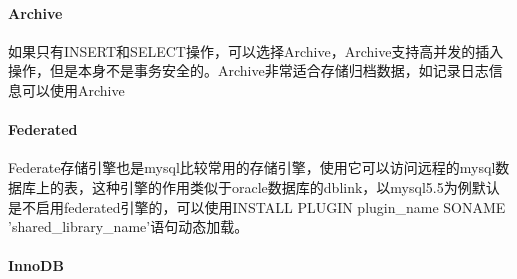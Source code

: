\documentclass[../../../interview-questions.tex]{subfiles}
\begin{document}
 
\paragraph{Archive}

如果只有INSERT和SELECT操作，可以选择Archive，Archive支持高并发的插入操作，但是本身不是事务安全的。Archive非常适合存储归档数据，如记录日志信息可以使用Archive

\paragraph{Federated}

Federate存储引擎也是mysql比较常用的存储引擎，使用它可以访问远程的mysql数据库上的表，这种引擎的作用类似于oracle数据库的dblink，以mysql5.5为例默认是不启用federated引擎的，可以使用INSTALL PLUGIN plugin\_name SONAME 'shared\_library\_name'语句动态加载。

\paragraph{InnoDB}
\end{document}
